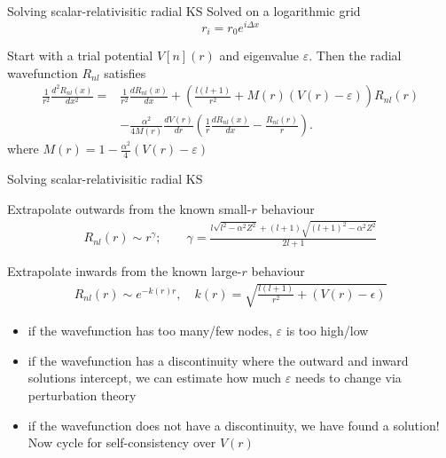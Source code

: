 \documentclass[xcolor=table,aspectratio=169]{beamer}
\numberwithin{equation}{section}
\begin{document}
\begin{frame}{Solving scalar-relativisitic radial KS}
   Solved on a logarithmic grid
   \begin{equation*}
      r_i = r_0 e^{i \Delta x}
   \end{equation*}

   Start with a trial potential $V[n](r)$ and eigenvalue $\varepsilon$. Then the radial wavefunction $R_{nl}$ satisfies
   \begin{align*}
      \frac{1}{r^2} \frac{d^2 R_{n l}(x)}{d x^2}= & \frac{1}{r^2} \frac{d R_{n l}(x)}{d x}+\left(\frac{l(l+1)}{r^2}+M(r)(V(r)-\varepsilon)\right) R_{n l}(r)                                    \\
                                                  & -\frac{\alpha^2}{4 M(r)} \frac{d V(r)}{d r}\left(\frac{1}{r} \frac{d R_{n l}(x)}{d x} - \frac{R_{n l}(r)}{r}\right) .
   \end{align*}
   where $M(r) = 1-\frac{\alpha^2}{4}(V(r)-\varepsilon)$

\end{frame}
\begin{frame}{Solving scalar-relativisitic radial KS}

   Extrapolate outwards from the known small-$r$ behaviour
   \begin{align*}
      R_{nl}(r) \sim r^\gamma; \qquad \gamma=\frac{l \sqrt{l^2-\alpha^2 Z^2}+(l+1) \sqrt{(l+1)^2-\alpha^2 Z^2}}{2 l+1}
   \end{align*}

   Extrapolate inwards from the known large-$r$ behaviour
   \begin{align*}
      R_{n l}(r) \sim e^{-k(r) r}, \quad k(r)=\sqrt{\frac{l(l+1)}{r^2}+(V(r)-\epsilon)}
   \end{align*}

   \begin{itemize}
      \item if the wavefunction has too many/few nodes, $\varepsilon$ is too high/low
      \item if the wavefunction has a discontinuity where the outward and inward solutions intercept, we can estimate how much $\varepsilon$ needs to change via perturbation theory
      \item if the wavefunction does not have a discontinuity, we have found a solution! Now cycle for self-consistency over $V(r)$
   \end{itemize}

\end{frame}
\end{document}
